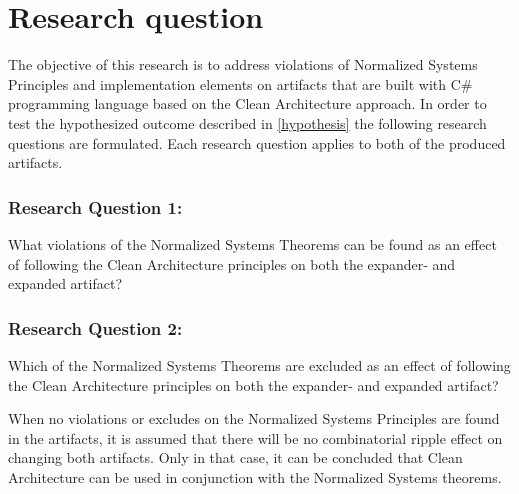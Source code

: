 \section{Research question} \label{sec:research_questions}

The objective of this research is to address violations of Normalized Systems Principles
and implementation elements on artifacts that are built with C\# programming language
based on the Clean Architecture approach. In order to test the hypothesized outcome
described in \ref{hypothesis} the following research questions are formulated. Each
research question applies to both of the produced artifacts.

\subsubsection*{Research Question 1:}
What violations of the Normalized Systems Theorems can be found as an effect of
following the Clean Architecture principles on both the expander- and expanded artifact?

\subsubsection*{Research Question 2:}
Which of the Normalized Systems Theorems are excluded as an effect of following the
Clean Architecture principles on both the expander- and expanded artifact?

When no violations or excludes on the Normalized Systems Principles are found in the
artifacts, it is assumed that there will be no combinatorial ripple effect on changing
both artifacts. Only in that case, it can be concluded that Clean Architecture can be
used in conjunction with the Normalized Systems theorems. 